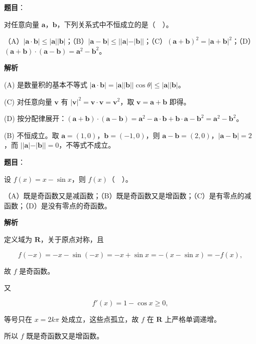 \begin{answer}

\textbf{题目}：

对任意向量 $\boldsymbol{a}$，$\boldsymbol{b}$，下列关系式中不恒成立的是（　）。

（A）$|\boldsymbol{a}\cdot\boldsymbol{b}|\le|\boldsymbol{a}||\boldsymbol{b}|$；（B）$|\boldsymbol{a}-\boldsymbol{b}|\le||\boldsymbol{a}|-|\boldsymbol{b}||$；（C）$(\boldsymbol{a}+\boldsymbol{b})^{2}=|\boldsymbol{a}+\boldsymbol{b}|^{2}$；（D）$(\boldsymbol{a}+\boldsymbol{b})\cdot(\boldsymbol{a}-\boldsymbol{b})=\boldsymbol{a}^{2}-\boldsymbol{b}^{2}$。

\textbf{解析}

(A) 是数量积的基本不等式 $|\boldsymbol{a}\cdot\boldsymbol{b}|=|\boldsymbol{a}||\boldsymbol{b}||\cos\theta|\le|\boldsymbol{a}||\boldsymbol{b}|$。

(C) 对任意向量 $\boldsymbol{v}$ 有 $|\boldsymbol{v}|^{2}=\boldsymbol{v}\cdot\boldsymbol{v}=\boldsymbol{v}^{2}$，取 $\boldsymbol{v}=\boldsymbol{a}+\boldsymbol{b}$ 即得。

(D) 按分配律展开：$(\boldsymbol{a}+\boldsymbol{b})\cdot(\boldsymbol{a}-\boldsymbol{b})=\boldsymbol{a}^{2}-\boldsymbol{a}\cdot\boldsymbol{b}+\boldsymbol{b}\cdot\boldsymbol{a}-\boldsymbol{b}^{2}=\boldsymbol{a}^{2}-\boldsymbol{b}^{2}$。

(B) 不恒成立。取 $\boldsymbol{a}=(1,0)$，$\boldsymbol{b}=(-1,0)$，则 $\boldsymbol{a}-\boldsymbol{b}=(2,0)$，$|\boldsymbol{a}-\boldsymbol{b}|=2$，而 $||\boldsymbol{a}|-|\boldsymbol{b}||=0$，不等式不成立。


\end{answer}
\begin{answer}

\textbf{题目}：

设 $f(x)=x-\sin x$，则 $f(x)$（　）。

（A）既是奇函数又是减函数；（B）既是奇函数又是增函数；（C）是有零点的减函数；（D）是没有零点的奇函数。

\textbf{解析}

定义域为 $\mathbf{R}$，关于原点对称，且

\nopagebreak[4]
\[
f(-x)=-x-\sin(-x)=-x+\sin x=-(x-\sin x)=-f(x),
\]

故 $f$ 是奇函数。

又

\nopagebreak[4]
\[
f'(x)=1-\cos x\ge 0,
\]

等号只在 $x=2k\pi$ 处成立，这些点孤立，故 $f$ 在 $\mathbf{R}$ 上严格单调递增。

所以 $f$ 既是奇函数又是增函数。


\end{answer}
